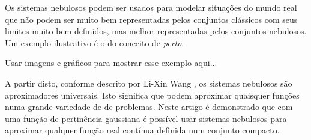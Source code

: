 Os sistemas nebulosos podem ser usados para modelar situações do mundo real que não podem ser muito bem representadas pelos conjuntos clássicos com seus limites muito bem definidos, mas melhor representadas pelos conjuntos nebulosos. Um exemplo ilustrativo é o do conceito de \emph{perto}.

Usar imagens e gráficos para mostrar esse exemplo aqui...

A partir disto, conforme descrito por Li-Xin Wang \citep{fuzzy_2}, os sistemas nebulosos são aproximadores universais. Isto significa que podem aproximar quaisquer funções numa grande variedade de de problemas. Neste artigo é demonstrado que com uma função de pertinência gaussiana é possível usar sistemas nebulosos para aproximar qualquer função real contínua definida num conjunto compacto.